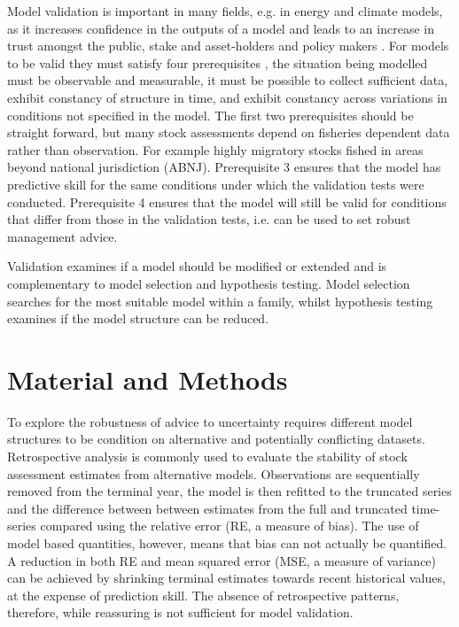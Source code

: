 \documentclass[a4paper]{article}
\begin{document}
Model validation is important in many fields, e.g. in energy and climate models, as it increases confidence in the outputs of a model and leads to an increase in trust amongst the public, stake and asset-holders and policy makers \citep{kell2019optimising}. For models to be valid they must satisfy four prerequisites \cite{hodges1992you}, the situation being modelled must be observable and measurable, it must be possible to collect sufficient data, exhibit constancy of structure in time, and exhibit constancy across variations in conditions not specified in the model. The first two prerequisites should be straight forward, but many stock assessments depend on fisheries dependent data rather than observation. For example highly migratory stocks fished in areas beyond national jurisdiction (ABNJ). Prerequisite 3 ensures that the model has predictive skill for the same conditions under which the validation tests were conducted. Prerequisite 4 ensures that the model will still be valid for conditions that differ from those in the validation tests, i.e. can be used to set robust management advice. 

Validation examines if a model should be modified or extended and is complementary to model selection and hypothesis testing. Model selection searches for the most suitable model within a family, whilst hypothesis testing examines if the model structure can be reduced.

\section{Material and Methods}

To explore the robustness of advice to uncertainty requires different model structures to be condition on alternative and potentially conflicting datasets. %
Retrospective analysis is commonly used to evaluate the stability of stock assessment estimates from alternative models. Observations are sequentially removed from the terminal year, the model is then refitted to the truncated series and the difference between between estimates from the full and truncated time-series compared using the relative error (RE, a measure of bias). The use of model based quantities, however, means that bias can not actually be quantified. A reduction in both RE and mean squared error (MSE, a measure of variance) can be achieved by shrinking terminal estimates towards recent historical values, at the expense of prediction skill. The absence of retrospective patterns, therefore, while reassuring is not sufficient for model validation.
\end{document}
